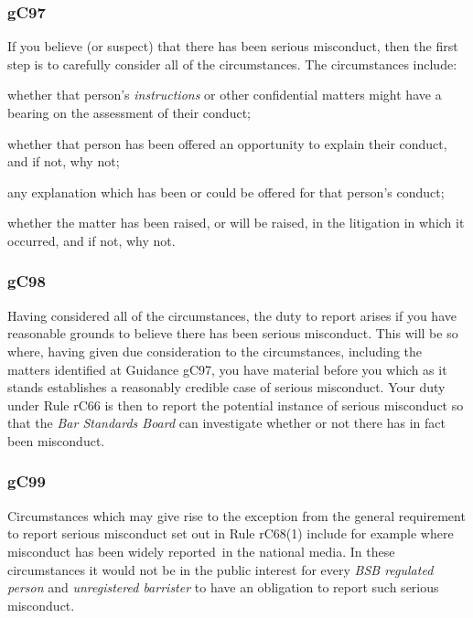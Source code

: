 \subsubsection{\color{darkgrey}gC97}

If you believe (or suspect) that there has been serious misconduct, then
the first step is to carefully consider all of the circumstances. The
circumstances include:
\begin{numlist}\item whether that person's \emph{instructions} or other confidential
matters might have a bearing on the assessment of their conduct;
\item whether that person has been offered an opportunity to explain their
conduct, and if not, why not;
\item any explanation which has been or could be offered for that person's
conduct;
\item whether the matter has been raised, or will be raised, in the
litigation in which it occurred, and if not, why not.
\end{numlist}
\subsubsection{\color{darkgrey}gC98}

Having considered all of the circumstances, the duty to report arises if
you have reasonable grounds to believe there has been serious
misconduct. This will be so where, having given due consideration to the
circumstances, including the matters identified at Guidance gC97, you
have material before you which as it stands establishes a reasonably
credible case of serious misconduct. Your duty under Rule rC66 is then
to report the potential instance of serious misconduct so that the
\emph{Bar Standards Board} can investigate whether or not there has in
fact been misconduct.

\subsubsection{\color{darkgrey}gC99}

Circumstances which may give rise to the exception from the general
requirement to report serious misconduct set out in Rule rC68(1) include
for example where misconduct has been widely reported~in the national
media. In these circumstances it would not be in the public interest for
every \emph{BSB regulated person} and \emph{unregistered barrister} to
have an obligation to report such serious misconduct.

